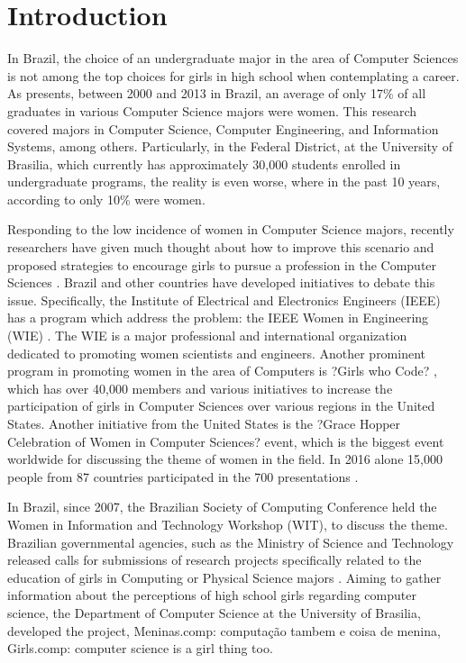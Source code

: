 \section{Introduction}\label{sec:intro}%

In Brazil, the choice of an undergraduate major in the area of Computer Sciences is not among the top choices for girls in high school when contemplating a career. As \cite{maia_2016} presents, between 2000 and 2013 in Brazil, an average of only 17\% of all graduates in various Computer Science majors were women. This research covered majors in Computer Science, Computer Engineering, and Information Systems, among others. Particularly, in the Federal District, at the University of Brasilia, which currently has approximately 30,000 students enrolled in undergraduate programs, the reality is even worse, where in the past 10 years, according to \cite{couto_2014} only 10\% were women. 

	Responding to the low incidence of women in Computer Science majors, recently researchers have given much thought about how to improve this scenario and proposed strategies to encourage girls to pursue a profession in the Computer Sciences   \cite{cohoon_2002} \cite{couto_2014}  \cite{gurer_2002}  \cite{maia_2016}. Brazil and other countries have developed initiatives to debate this issue. Specifically, the Institute of Electrical and Electronics Engineers (IEEE) has a program which address the problem: the IEEE Women in Engineering (WIE) \cite{wie2017}. The WIE is a major professional and international organization dedicated to promoting women scientists and engineers. Another prominent program in promoting women in the area of Computers is ?Girls who Code? \cite{girlsWC_2017}, which has over 40,000 members and various initiatives to increase the participation of girls in Computer Sciences over various regions in the United States. Another initiative from the United States is the ?Grace Hopper Celebration of Women in Computer Sciences? event, which is the biggest event worldwide for discussing the theme of women in the field. In 2016 alone 15,000 people from 87 countries participated in the 700 presentations \cite{GHC_2017}.
	
	In Brazil, since 2007, the Brazilian Society of Computing Conference held the Women in Information and Technology Workshop (WIT), to discuss the theme. Brazilian governmental agencies, such as the Ministry of Science and Technology released calls for submissions of research projects specifically related to the education of girls in Computing or Physical Science majors \cite{cnpq_2017}. Aiming to gather information about the perceptions of high school girls regarding computer science, the Department of Computer Science at the University of Brasilia, developed the project, Meninas.comp: computação  tambem e coisa de menina, Girls.comp: computer science is a girl thing too.  
	

